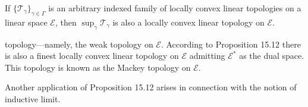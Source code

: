 If $\{\mathcal{T}_\gamma\}_{\gamma \in \Gamma}$ is an arbitrary indexed family of locally convex linear topologies on a linear space $\mathcal{E}$, then $\sup_{\gamma} \mathcal{T}_\gamma$ is also a locally convex linear topology on $\mathcal{E}$.

topology—namely, the weak topology on $\mathcal{E}$. According to Proposition 15.12 there is also a finest locally convex linear topology on $\mathcal{E}$ admitting $\mathcal{E}^*$ as the dual space. This topology is known as the Mackey topology on $\mathcal{E}$.

Another application of Proposition 15.12 arises in connection with the notion of inductive limit.
